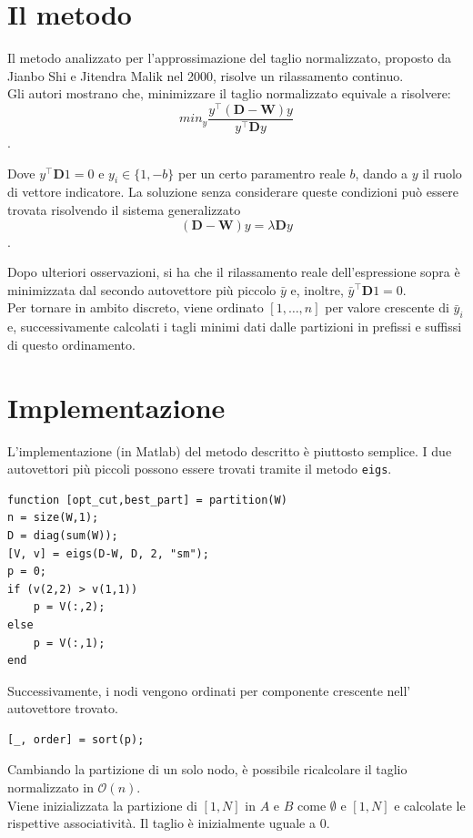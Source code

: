 \documentclass{article}
\newcommand{\W}{\mathbf{W}}
\newcommand{\D}{\mathbf{D}}
\begin{document}
\section{Il metodo}
Il metodo analizzato per l'approssimazione del taglio normalizzato, proposto da Jianbo Shi e Jitendra Malik nel 2000, risolve un rilassamento continuo.\\
Gli autori mostrano che, minimizzare il taglio normalizzato equivale a risolvere:
$$ min_y\frac{y^\top (\D-\W)y}{y ^\top \D y}$$.

Dove $y^\top \D 1 = 0$ e $y_i\in\{1, -b\}$ per un certo paramentro reale $b$, dando a $y$ il ruolo di vettore indicatore.
La soluzione senza considerare queste condizioni pu\`o essere trovata risolvendo il sistema generalizzato
$$ (\D - \W)y = \lambda \D y $$.

Dopo ulteriori osservazioni, si ha che il rilassamento reale dell'espressione sopra \`e minimizzata dal secondo autovettore pi\`u piccolo $\bar{y}$ e, inoltre, $\bar{y}^\top \D 1 = 0$. \\
Per tornare in ambito discreto, viene ordinato $[1, \ldots, n]$ per valore crescente di $\bar{y}_i$ e, successivamente calcolati i tagli minimi dati dalle partizioni in prefissi e suffissi di questo ordinamento.

\section{Implementazione}

L'implementazione (in Matlab) del metodo descritto \`e piuttosto semplice.
I due autovettori pi\`u piccoli possono essere trovati tramite il metodo
\texttt{eigs}.

\begin{lstlisting}[style=Matlab-editor]
function [opt_cut,best_part] = partition(W)
n = size(W,1);
D = diag(sum(W));
[V, v] = eigs(D-W, D, 2, "sm");
p = 0;
if (v(2,2) > v(1,1))
    p = V(:,2);
else
    p = V(:,1);
end
\end{lstlisting}

Successivamente, i nodi vengono ordinati per componente crescente nell'
autovettore trovato.

\begin{lstlisting}[style=Matlab-editor]
[_, order] = sort(p);
\end{lstlisting}

Cambiando la partizione di un solo nodo, \`e possibile ricalcolare il taglio normalizzato
in $\mathcal{O}(n)$.\\ Viene inizializzata la partizione di $[1, N]$ in $A$ e $B$ come
$\emptyset$ e $[1, N]$ e calcolate le rispettive associativit\`a. Il taglio \`e inizialmente uguale a $0$.
\end{document}
